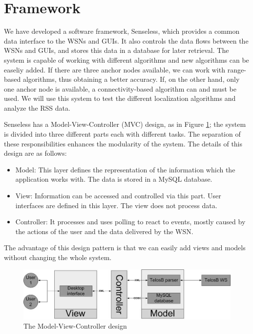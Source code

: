 \section{Framework}
We have developed a software framework, Senseless, which provides a common data interface to the WSNs and GUIs. It also controls the data flows between the WSNs and GUIs, and stores this data in a database for later retrieval. The system is capable of working with different algorithms and new algorithms can be easeliy added. If there are three anchor nodes available, we can work with range-based algorithms, thus obtaining a better accuracy. If, on the other hand, only one anchor node is available, a connectivity-based algorithm can and must be used. We will use this system to test the different localization algorithms and analyze the RSS data. 

Senseless has a Model-View-Controller (MVC) design, as in Figure \ref{fig:mvc}; the system is divided into three different parts each with different tasks. The separation of these responsibilities enhances the modularity of the system. 
The details of this design are as follows:
\begin{itemize}
	\item Model: This layer defines the representation of the information which the application works with. The data is stored in a MySQL database. 
	\item View: Information can be accessed and controlled via this part. User interfaces are defined in this layer. The view does not process data. 
	\item Controller: It processes and uses polling to react to events, mostly caused by the actions of the user and the data delivered by the WSN. 
\end{itemize}
The advantage of this design pattern is that we can easily add views and models without changing the whole system. 

\begin{figure}[h]
	\centering
		\includegraphics[scale=0.30]{Images/mvc.jpg}
	\caption{The Model-View-Controller design}
	\label{fig:mvc}
\end{figure}


